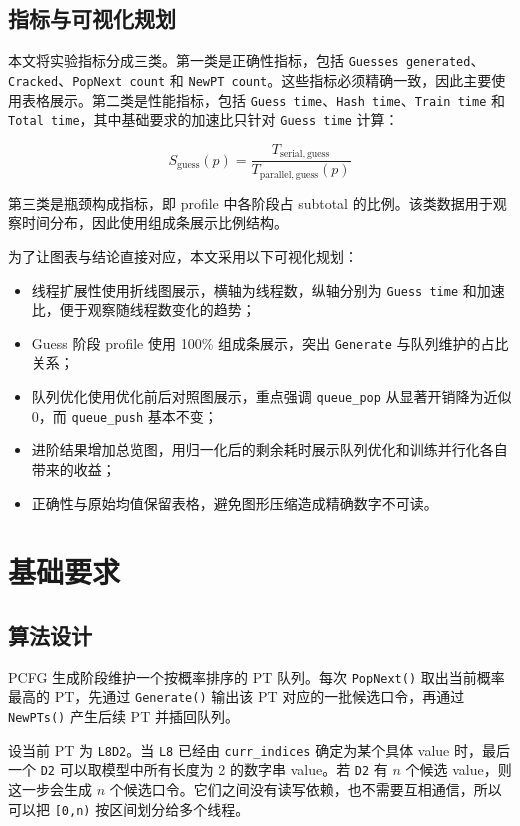 \documentclass[UTF8,a4paper,12pt]{ctexart}
\begin{document}
\subsection{指标与可视化规划}

本文将实验指标分成三类。第一类是正确性指标，包括 \texttt{Guesses generated}、\texttt{Cracked}、\texttt{PopNext count} 和 \texttt{NewPT count}。这些指标必须精确一致，因此主要使用表格展示。第二类是性能指标，包括 \texttt{Guess time}、\texttt{Hash time}、\texttt{Train time} 和 \texttt{Total time}，其中基础要求的加速比只针对 \texttt{Guess time} 计算：

\[
S_{\mathrm{guess}}(p)=\frac{T_{\mathrm{serial,guess}}}{T_{\mathrm{parallel,guess}}(p)}
\]

第三类是瓶颈构成指标，即 profile 中各阶段占 subtotal 的比例。该类数据用于观察时间分布，因此使用组成条展示比例结构。

为了让图表与结论直接对应，本文采用以下可视化规划：

\begin{itemize}
  \item 线程扩展性使用折线图展示，横轴为线程数，纵轴分别为 \texttt{Guess time} 和加速比，便于观察随线程数变化的趋势；
  \item Guess 阶段 profile 使用 100\% 组成条展示，突出 \texttt{Generate} 与队列维护的占比关系；
  \item 队列优化使用优化前后对照图展示，重点强调 \texttt{queue\_pop} 从显著开销降为近似 0，而 \texttt{queue\_push} 基本不变；
  \item 进阶结果增加总览图，用归一化后的剩余耗时展示队列优化和训练并行化各自带来的收益；
  \item 正确性与原始均值保留表格，避免图形压缩造成精确数字不可读。
\end{itemize}

\section{基础要求}

\subsection{算法设计}

PCFG 生成阶段维护一个按概率排序的 PT 队列。每次 \texttt{PopNext()} 取出当前概率最高的 PT，先通过 \texttt{Generate()} 输出该 PT 对应的一批候选口令，再通过 \texttt{NewPTs()} 产生后续 PT 并插回队列。

设当前 PT 为 \texttt{L8D2}。当 \texttt{L8} 已经由 \texttt{curr\_indices} 确定为某个具体 value 时，最后一个 \texttt{D2} 可以取模型中所有长度为 2 的数字串 value。若 \texttt{D2} 有 $n$ 个候选 value，则这一步会生成 $n$ 个候选口令。它们之间没有读写依赖，也不需要互相通信，所以可以把 \texttt{[0,n)} 按区间划分给多个线程。
\end{document}
